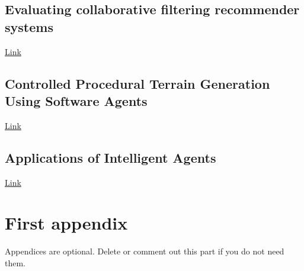 \documentclass[journal]{IEEEtran}
\begin{document}
\subsection{Evaluating collaborative filtering recommender systems\cite{herlocker2004evaluating}}
\href{https://dl-acm-org.ezproxy.falmouth.ac.uk/ft_gateway.cfm?id=963772&ftid=247769&dwn=1&CFID=19451816&CFTOKEN=60d77465fa35c5bb-88408FAD-D71F-E81D-FF436ADBE71D45CA}{Link}

\subsection{Controlled Procedural Terrain Generation Using Software Agents\cite{doran2010controlled}}
\href{https://ieeexplore-ieee-org.ezproxy.falmouth.ac.uk/document/5454273}{Link}

\subsection{Applications of Intelligent Agents\cite{jennings1998applications}}
\href{ftp://143.106.148.79/pub/docs/gudwin/ia009/jennings98applications.pdf}{Link}





\appendices
\section{First appendix}
Appendices are optional. Delete or comment out this part if you do not need them.

\end{document}
